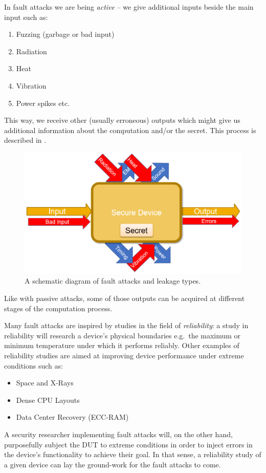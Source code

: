 In fault attacks we are being \emph{active} -- we give additional inputs beside the main input such as:
\begin{enumerate}
	\item Fuzzing (garbage or bad input)
	\item Radiation
	\item Heat
	\item Vibration
	\item Power spikes etc.
\end{enumerate}

This way, we receive other (usually erroneous) outputs which might give us additional information about the computation and/or the secret. This process is described in .

\begin{figure}[!ht]
	\centering
	\includegraphics[width=0.7\linewidth]{images/chapter_9/fault_attacks_schematic.png}
	\caption{A schematic diagram of fault attacks and leakage types.}\label{fig:fault_attacks_schematic}
\end{figure}

Like with passive attacks, some of those outputs can be acquired at different stages of the computation process.

Many fault attacks are inspired by studies in the field of \emph{reliability}: a study in reliability will research a device's physical boundaries e.g.\ the maximum or minimum temperature under which it performs reliably. Other examples of reliability studies are aimed at improving device performance under extreme conditions such as:
\begin{itemize}
	\item Space and X-Rays
	\item Dense CPU Layouts
	\item Data Center Recovery (ECC-RAM)
\end{itemize}

A security researcher implementing fault attacks will, on the other hand,  purposefully subject the DUT to extreme conditions in order to inject errors in the device's functionality to achieve their goal. In that sense, a reliability study of a given device can lay the ground-work for the fault attacks to come.

